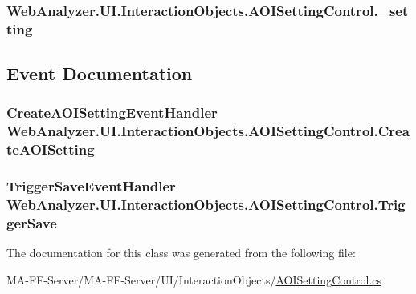 \subsubsection[{\+\_\+setting}]{ Web\+Analyzer.\+U\+I.\+Interaction\+Objects.\+A\+O\+I\+Setting\+Control.\+\_\+setting\hspace{0.3cm}{\ttfamily [private]}}\label{class_web_analyzer_1_1_u_i_1_1_interaction_objects_1_1_a_o_i_setting_control_a99ecb89643396f52452299c28f5836f6}


\subsection{Event Documentation}
\hypertarget{class_web_analyzer_1_1_u_i_1_1_interaction_objects_1_1_a_o_i_setting_control_a655f9d463578bed0ae1ce3243eee82c0}{}
\subsubsection[{Create\+A\+O\+I\+Setting}]{\setlength{\rightskip}{0pt plus 5cm}Create\+A\+O\+I\+Setting\+Event\+Handler Web\+Analyzer.\+U\+I.\+Interaction\+Objects.\+A\+O\+I\+Setting\+Control.\+Create\+A\+O\+I\+Setting}\label{class_web_analyzer_1_1_u_i_1_1_interaction_objects_1_1_a_o_i_setting_control_a655f9d463578bed0ae1ce3243eee82c0}
\hypertarget{class_web_analyzer_1_1_u_i_1_1_interaction_objects_1_1_a_o_i_setting_control_a752fb801d539bc3df62f41bb854074e2}{}
\subsubsection[{Trigger\+Save}]{\setlength{\rightskip}{0pt plus 5cm}Trigger\+Save\+Event\+Handler Web\+Analyzer.\+U\+I.\+Interaction\+Objects.\+A\+O\+I\+Setting\+Control.\+Trigger\+Save}\label{class_web_analyzer_1_1_u_i_1_1_interaction_objects_1_1_a_o_i_setting_control_a752fb801d539bc3df62f41bb854074e2}


The documentation for this class was generated from the following file\+:\begin{DoxyCompactItemize}
\item 
M\+A-\/\+F\+F-\/\+Server/\+M\+A-\/\+F\+F-\/\+Server/\+U\+I/\+Interaction\+Objects/\hyperlink{_a_o_i_setting_control_8cs}{A\+O\+I\+Setting\+Control.\+cs}\end{DoxyCompactItemize}
